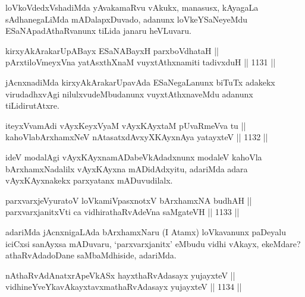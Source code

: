 \begin{artha}
loVkoVdedxVshadiMda yAvakamaRvu vAkukx, manasusx, kAyagaLa sAdhanegaLiMda mADalapxDuvado, adanunx loVkeYSaNeyeMdu ESaNApadAthaRvanunx tiLida janaru heVLuvaru.
\end{artha}


\begin{shl}
kirxyAkArakarUpABayx ESaNABayxH parxboVdhataH || \\
pArxtiloVmeyxVna yatAsxthXnaM vuyxtAthxnamiti tadivxduH \hfill || 1131 ||  
\end{shl}

\begin{artha}
jAcnxnadiMda kirxyAkArakarUpavAda ESaNegaLanunx biTuTx adakekx virudadhxvAgi nilulxvudeMbudanunx vuyxtAthxnaveMdu adanunx tiLidirutAtxre.
\end{artha}

\begin{shl}
iteyxVvamAdi vAyxKeyxVyaM vAyxKAyxtaM pUvaRmeVva tu || \\
kahoVlabArxhamxNeV nAtasatxdAvxyXKAyxnAya yatayxteV \hfill || 1132 ||  
\end{shl}

\begin{artha}
ideV modalAgi vAyxKAyxnamADabeVkAdadxnunx modaleV kahoVla bArxhamxNadalilx vAyxKAyxna mADidAdxyitu, adariMda adara vAyxKAyxnakekx parxyatanx mADuvudilalx.
\end{artha}


\begin{shl}
parxvarxjeVyuratoV loVkamiVpasxnotxV bArxhamxNA budhAH || \\
parxvarxjanitxVti ca vidhirathaRvAdeVna saMgateVH \hfill || 1133 ||  
\end{shl}

\begin{artha}
adariMda jAcnxnigaLAda bArxhamxNaru (I Atamx) loVkavanunx paDeyalu iciCxsi sanAyxsa mADuvaru, `parxvarxjanitx' eMbudu vidhi vAkayx, ekeMdare? athaRvAdadoDane saMbaMdhiside, adariMda.
\end{artha}


\begin{shl}
nAthaRvAdAnatxrApeVkASx hayxthaRvAdasayx yujayxteV || \\
vidhineYveYkavAkayxtavxmathaRvAdasayx yujayxteV \hfill || 1134 ||  
\end{shl}

